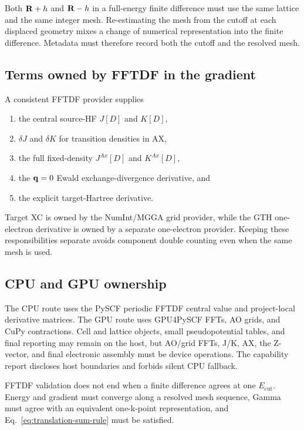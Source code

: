 Both $\mathbf{R}+h$ and $\mathbf{R}-h$ in a full-energy finite difference must use the same
lattice and the same integer mesh.  Re-estimating the mesh from the cutoff at
each displaced geometry mixes a change of numerical representation into the
finite difference.  Metadata must therefore record both the cutoff and the
resolved mesh.

\subsection{Terms owned by FFTDF in the gradient}

A consistent FFTDF provider supplies
\begin{enumerate}
  \item the central source-HF $J[D]$ and $K[D]$,
  \item $\delta J$ and $\delta K$ for transition densities in AX,
  \item the full fixed-density $J^{Ax}[D]$ and $K^{Ax}[D]$,
  \item the $\mathbf{q}=0$ Ewald exchange-divergence derivative, and
  \item the explicit target-Hartree derivative.
\end{enumerate}
Target XC is owned by the NumInt/MGGA grid provider, while the GTH
one-electron derivative is owned by a separate one-electron provider.  Keeping
these responsibilities separate avoids component double counting even when
the same mesh is used.

\subsection{CPU and GPU ownership}

The CPU route uses the PySCF periodic FFTDF central value and project-local
derivative matrices.  The GPU route uses GPU4PySCF FFTs, AO grids, and CuPy
contractions.  Cell and lattice objects, small pseudopotential tables, and
final reporting may remain on the host, but AO/grid FFTs, J/K, AX, the
Z-vector, and final electronic assembly must be device operations.  The
capability report discloses host boundaries and forbids silent CPU fallback.

FFTDF validation does not end when a finite difference agrees at one
$E_{\mathrm{cut}}$.  Energy and gradient must converge along a resolved mesh
sequence, Gamma must agree with an equivalent one-k-point representation, and
Eq.~\eqref{eq:translation-sum-rule} must be satisfied.
